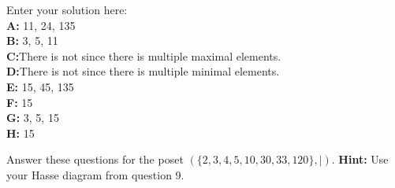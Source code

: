 \documentclass[10pt]{exam}
\begin{document}
\begin{questions}

\begin{solution}
    Enter your solution here:\\
    \textbf{A:} 11, 24, 135\\
    \textbf{B:} 3, 5, 11\\
    \textbf{C:}There is not since there is multiple maximal elements.\\
    \textbf{D:}There is not since there is multiple minimal elements.\\
    \textbf{E:} 15, 45, 135\\
    \textbf{F:} 15\\
    \textbf{G:} 3, 5, 15\\
    \textbf{H:} 15\\
\end{solution}

\question[16] Answer these questions for the poset $(\{2, 3, 4, 5, 10, 30, 33, 120\}, |)$. \textbf{Hint:} Use your Hasse diagram from question 9.

\end{questions}
\end{document}

